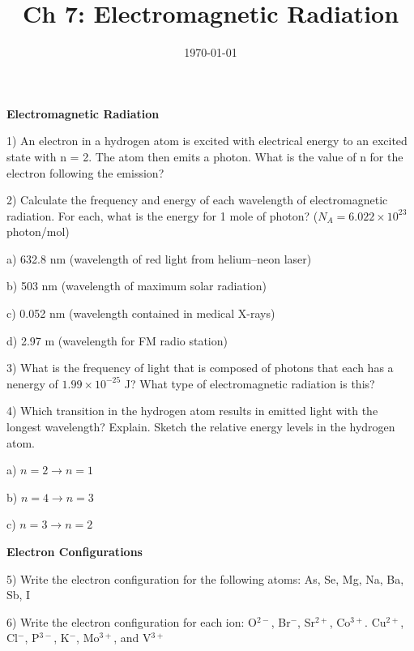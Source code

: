 \documentclass[12pt]{article}
\title{\textbf{Ch 7: Electromagnetic Radiation}}
\date{\today}
\begin{document}
\maketitle 

\textbf{Electromagnetic Radiation}

1) An electron in a hydrogen atom is excited with electrical energy to
an excited state with n = 2. The atom then emits a photon. What is
the value of n for the electron following the emission?
\vspace{1in}

2) Calculate the frequency and energy of each wavelength of electromagnetic
radiation. For each, what is the energy for 1 mole of photon? ($N_A = 6.022\times 10^{23}$ photon/mol) 

a) 632.8 nm (wavelength of red light from helium–neon laser)

b) 503 nm (wavelength of maximum solar radiation)

c) 0.052 nm (wavelength contained in medical X-rays)

d) 2.97 m (wavelength for FM radio station)

\vspace{1in}

3) What is the frequency of light that is composed of photons that each
has a nenergy of $1.99\times 10^{-25}$ J? What type of electromagnetic
radiation is this?
\newpage

4) Which transition in the hydrogen atom results in emitted light with
the longest wavelength? Explain. Sketch the relative energy levels in the
hydrogen atom.

a) $n = 2 \rightarrow n = 1$

b) $n = 4 \rightarrow n = 3$

c) $n = 3 \rightarrow n = 2$
\vspace{1in}

\textbf{Electron Configurations}

5) Write the electron configuration for the following atoms:
As, Se, Mg, Na, Ba, Sb, I
\vspace{2in}

6) Write the electron configuration for each ion:
O$^{2-}$, Br$^-$, Sr$^{2+}$, Co$^{3+}$. Cu$^{2+}$, Cl$^-$, P$^{3-}$,
K$^-$, Mo$^{3+}$, and V$^{3+}$
\end{document}

